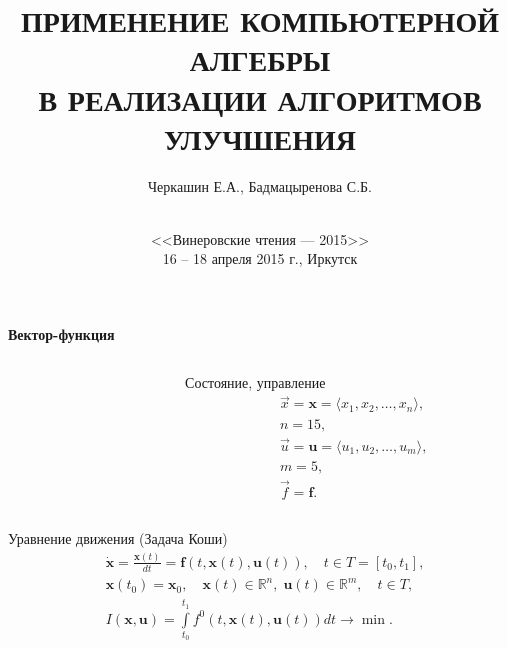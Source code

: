 \documentclass[10pt]{beamer}
\begin{document}
\title[КОМПЬЮТЕРНАЯ АЛГЕБРА В ЗАДАЧАХ ОПТИМИЗАЦИИ]{ПРИМЕНЕНИЕ КОМПЬЮТЕРНОЙ АЛГЕБРЫ\\
В РЕАЛИЗАЦИИ АЛГОРИТМОВ УЛУЧШЕНИЯ}
\author{Черкашин Е.А., Бадмацыренова С.Б.}
\date[2015]{{}\\[1.5cm]
<<Винеровские чтения --- 2015>>\\
16 -- 18 апреля 2015 г.,
Иркутск
}
\maketitle

\begin{frame}{\textbf{Вектор-функция} }
  \begin{columns}[t]
    \begin{column}{0.65\textwidth}\footnotesize
      \def\xyz{$x_1,x_2,x_3,\;x_4,x_5,x_6$} \def\yaw{$x_7,x_8$} \def\pitch{$x_9,x_{10}$}
      \def\roll{$\!\!\!\!\!\!x_{11},x_{12}$} \def\lift{$x_{13}$} \def\down{$\!\!x_{14}$}
      \def\thrust{$u_1$} \def\rudder{$u_5$} \def\drag{$x_{15}$}
      \def\flaps{$u_2$} \def\aeleron{$u_3$} \def\engine{}
      \def\elevator{$u_4$} \def\svgwidth{\columnwidth}
      
    \end{column}
    \begin{column}{0.35\textwidth}
      \begin{block}{Состояние, управление}%
        \vspace{-1.5em}
        \begin{align*}
          &\vec{x}=\mathbf{x}=\langle x_1,x_2,\ldots,x_n\rangle,\\
          &n=15,\\
          &\vec{u}=\mathbf{u}=\langle u_1,u_2,\ldots,u_m\rangle,\\
          &m=5,\\
          &\vec{f}=\mathbf{f}.
        \end{align*}
      \end{block}
    \end{column}
  \end{columns}
\begin{block}{Уравнение движения (Задача Коши)}
  \begin{align*}
&\dot{\mathbf{x}}=\frac{\mathbf{x}(t)}{dt}=\mathbf{f}(t,\mathbf{x}(t),\mathbf{u}(t)),\quad t \in T=[t_0,t_1], \\
&\mathbf{x}(t_0)=\mathbf{x}_0,\quad \mathbf{x}(t)\in \mathbb{R}^n,\; \mathbf{u}(t) \in \mathbb{R}^m,\quad t\in T, \\
&I(\mathbf{x},\mathbf{u})=\int\limits_{t_0}^{t_1}f^0(t,\mathbf{x}(t),\mathbf{u}(t))dt \to \min.
  \end{align*}
\end{block}
\end{frame}
\end{document}

